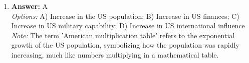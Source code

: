 \documentclass[12pt]{article}
\begin{document}
\begin{enumerate}[label=\arabic*.]
\\ \textit{Note:} The statement "Societal groups are constituted by social interaction" is the odd one out because it emphasizes the foundational role of social interaction in forming societal groups, whereas the other options likely focus on structural or institutional aspects without highlighting the interpersonal dynamics.
\item \textbf{Answer:} A
\\ \textit{Options:} A) Increase in the US population; B) Increase in US finances; C) Increase in US military capability; D) Increase in US international influence
\\ \textit{Note:} The term 'American multiplication table' refers to the exponential growth of the US population, symbolizing how the population was rapidly increasing, much like numbers multiplying in a mathematical table.
\end{enumerate}
\end{document}
